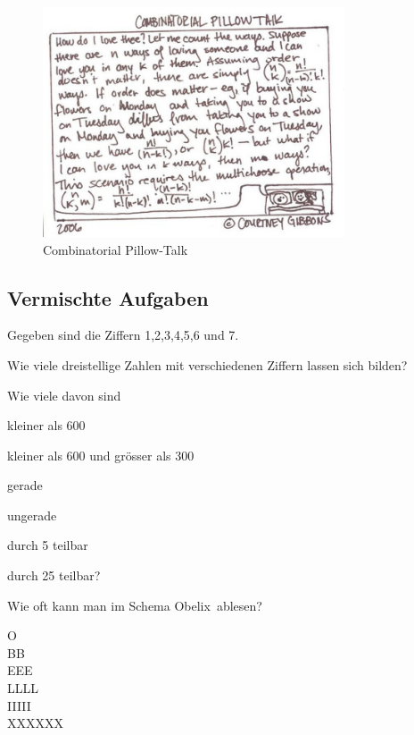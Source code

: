 \documentclass[%
11pt,%
twoside,%
titlepage,%
german,%
headsepline%
]{scrartcl}
\begin{document}
\begin{figure}
\begin{center}
\includegraphics[width=0.8\textwidth]{pictures/pillowtalk}
\caption{Combinatorial Pillow-Talk}
\end{center}
\end{figure}

\subsection{Vermischte Aufgaben}

 
 \begin{ueb}[Dreisteller]
 Gegeben sind die Ziffern 1,2,3,4,5,6 und 7.
 \begin{enumeratea}
 \item Wie viele dreistellige Zahlen mit verschiedenen
Ziffern lassen sich bilden?
 \end{enumeratea}
 Wie viele davon sind
 \begin{enumeratea}
 \addtocounter{enumi}{1}
 \item kleiner als 600
 \item kleiner als 600 und grösser als 300
 \item gerade
 \item ungerade
 \item durch 5 teilbar
 \item durch 25 teilbar?
 \end{enumeratea}
 \end{ueb}
 
 \begin{ueb}[Obelix]
 Wie oft kann man im Schema \glqq Obelix\grqq\ ablesen?
 \begin{center}
 \ttfamily
 O\\
 B\q B\\
 E\q E\q E\\
 L\q L\q L\q L\\
 I\q I\q I\q I\q I\q\\
 X\q X\q X\q X\q X\q X
 \end{center}
 \end{ueb}
\end{document}
